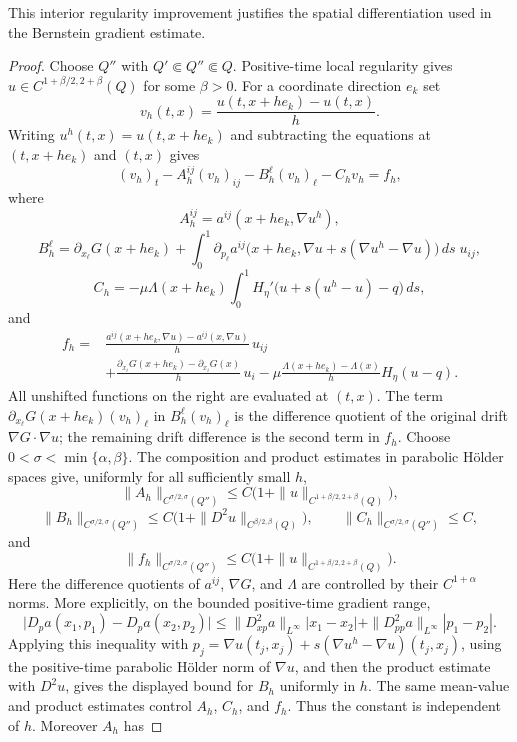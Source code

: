 \documentclass[11pt]{article}
\theoremstyle{remark}
\begin{document}
This interior regularity improvement justifies the spatial differentiation
used in the Bernstein gradient estimate.
\begin{proof}
Choose $Q''$ with $Q'\Subset Q''\Subset Q$.  Positive-time local
regularity gives $u\in C^{1+\beta/2,2+\beta}(Q)$ for some $\beta>0$.
For a coordinate direction $e_k$ set
\[
 v_h(t,x)=\frac{u(t,x+he_k)-u(t,x)}{h}.
\]
Writing $u^h(t,x)=u(t,x+he_k)$ and subtracting the equations at
$(t,x+he_k)$ and $(t,x)$ gives
\[
 (v_h)_t-A_h^{ij}(v_h)_{ij}-B_h^\ell(v_h)_\ell-C_hv_h=f_h,
\]
where
\[
 A_h^{ij}=a^{ij}(x+he_k,\nabla u^h),
\]
\[
 B_h^\ell=
 \partial_{x_\ell}G(x+he_k)
 +\int_0^1\partial_{p_\ell}a^{ij}
 \bigl(x+he_k,\nabla u+s(\nabla u^h-\nabla u)\bigr)\,ds\;u_{ij},
\]
\[
 C_h=-\mu\Lambda(x+he_k)
 \int_0^1H_\eta'\bigl(u+s(u^h-u)-q\bigr)\,ds,
\]
and
\[
\begin{aligned}
 f_h={}&
 \frac{a^{ij}(x+he_k,\nabla u)-a^{ij}(x,\nabla u)}{h}\,u_{ij}\\
 &+\frac{\partial_{x_i}G(x+he_k)-\partial_{x_i}G(x)}{h}\,u_i
 -\mu\frac{\Lambda(x+he_k)-\Lambda(x)}{h}H_\eta(u-q).
\end{aligned}
\]
All unshifted functions on the right are evaluated at $(t,x)$.  The
term $\partial_{x_\ell}G(x+he_k)(v_h)_\ell$ in $B_h^\ell(v_h)_\ell$
is the difference quotient of the original drift $\nabla G\cdot\nabla u$;
the remaining drift difference is the second term in $f_h$.  Choose
$0<\sigma<\min\{\alpha,\beta\}$.  The composition and product estimates
in parabolic H\"older spaces give, uniformly for all sufficiently small $h$,
\[
 \|A_h\|_{C^{\sigma/2,\sigma}(Q'')}
 \le C\bigl(1+\|u\|_{C^{1+\beta/2,2+\beta}(Q)}\bigr),
\]
\[
 \|B_h\|_{C^{\sigma/2,\sigma}(Q'')}
 \le C\bigl(1+\|D^2u\|_{C^{\beta/2,\beta}(Q)}\bigr),
 \qquad
 \|C_h\|_{C^{\sigma/2,\sigma}(Q'')}\le C,
\]
and
\[
 \|f_h\|_{C^{\sigma/2,\sigma}(Q'')}
 \le C\bigl(1+\|u\|_{C^{1+\beta/2,2+\beta}(Q)}\bigr).
\]
Here the difference quotients of $a^{ij}$, $\nabla G$, and $\Lambda$ are
controlled by their $C^{1+\alpha}$ norms.  More explicitly, on the bounded
positive-time gradient range,
\[
 \bigl|D_pa(x_1,p_1)-D_pa(x_2,p_2)\bigr|
 \le \|D^2_{xp}a\|_{L^\infty}|x_1-x_2|
      +\|D^2_{pp}a\|_{L^\infty}|p_1-p_2|.
\]
Applying this inequality with
$p_j=\nabla u(t_j,x_j)+s(\nabla u^h-\nabla u)(t_j,x_j)$,
using the positive-time parabolic H\"older norm of $\nabla u$, and then the
product estimate with $D^2u$, gives the displayed bound for $B_h$ uniformly
in $h$.  The same mean-value and product estimates control $A_h$, $C_h$, and
$f_h$.  Thus the constant is independent of $h$.  Moreover $A_h$ has

\end{proof}
\end{document}
